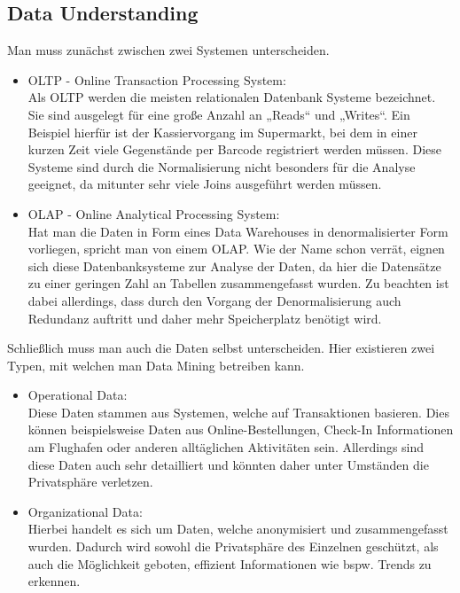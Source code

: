 \subsection{Data Understanding}
\label{sec:process:crispdm:du}

Man muss zunächst zwischen zwei Systemen unterscheiden.
\begin{itemize}
  \item OLTP - Online Transaction Processing System: \\
  Als OLTP werden die meisten relationalen Datenbank Systeme bezeichnet. Sie
  sind ausgelegt für eine große Anzahl an „Reads“ und „Writes“. Ein Beispiel
  hierfür ist der Kassiervorgang im Supermarkt, bei dem in einer kurzen Zeit
  viele Gegenstände per Barcode registriert werden müssen. Diese Systeme sind
  durch die Normalisierung nicht besonders für die Analyse geeignet, da mitunter
  sehr viele Joins ausgeführt werden müssen.
  \item OLAP - Online Analytical Processing System:  \\
  Hat man die Daten in Form eines Data Warehouses in denormalisierter Form
  vorliegen, spricht man von einem OLAP. Wie der Name schon verrät, eignen sich
  diese Datenbanksysteme zur Analyse der Daten, da hier die Datensätze zu einer
  geringen Zahl an Tabellen zusammengefasst wurden. Zu beachten ist dabei
  allerdings, dass durch den Vorgang der Denormalisierung auch Redundanz
  auftritt und daher mehr Speicherplatz benötigt wird.
\end{itemize}

Schließlich muss man auch die Daten selbst unterscheiden. Hier existieren zwei
Typen, mit welchen man Data Mining betreiben kann.
\begin{itemize}
  \item Operational Data:  \\
  Diese Daten stammen aus Systemen, welche auf Transaktionen basieren. Dies
  können beispielsweise Daten aus Online-Bestellungen, Check-In Informationen am
  Flughafen oder anderen alltäglichen Aktivitäten sein. Allerdings sind diese
  Daten auch sehr detailliert und könnten daher unter Umständen die Privatsphäre
  verletzen.
  \item Organizational Data:  \\
  Hierbei handelt es sich um Daten, welche anonymisiert und zusammengefasst
  wurden. Dadurch wird sowohl die Privatsphäre des Einzelnen geschützt, als auch
  die Möglichkeit geboten, effizient Informationen wie bspw. Trends zu erkennen.
\end{itemize}

